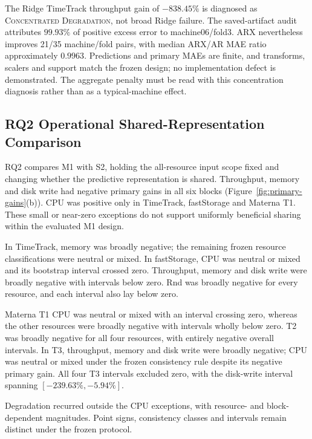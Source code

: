 \documentclass[a4paper,fleqn]{cas-dc}
\begin{document}
The Ridge TimeTrack throughput gain of $-838.45\%$ is diagnosed as
\textsc{Concentrated Degradation}, not broad Ridge failure. The saved-artifact
audit attributes $99.93\%$ of positive excess error to machine06/fold3.
ARX nevertheless improves 21/35 machine/fold pairs, with median ARX/AR MAE
ratio approximately $0.9963$. Predictions and primary MAEs are finite, and
transforms, scalers and support match the frozen design; no implementation
defect is demonstrated. The aggregate penalty must be read with this
concentration diagnosis rather than as a typical-machine effect.

\subsection{RQ2 Operational Shared-Representation Comparison}
\label{sec:results-rq2}

RQ2 compares M1 with S2, holding the all-resource input scope fixed and changing
whether the predictive representation is shared. Throughput, memory and disk
write had negative primary gains in all six blocks
(Figure~\ref{fig:primary-gains}(b)). CPU was positive only in TimeTrack,
fastStorage and Materna T1. These small or near-zero exceptions do not support
uniformly beneficial sharing within the evaluated M1 design.

In TimeTrack, memory was broadly negative; the remaining frozen resource
classifications were neutral or mixed. In fastStorage, CPU was neutral or
mixed and its bootstrap interval crossed zero. Throughput, memory and disk
write were broadly negative with intervals below zero. Rnd was broadly
negative for every resource, and each interval also lay below zero.

Materna T1 CPU was neutral or mixed with an interval crossing zero, whereas
the other resources were broadly negative with intervals wholly below zero.
T2 was broadly negative for all four resources, with entirely negative
overall intervals. In T3, throughput, memory and disk write were broadly
negative; CPU was neutral or mixed under the frozen consistency rule despite
its negative primary gain. All four T3 intervals excluded zero, with the
disk-write interval spanning $[-239.63\%,-5.94\%]$.

Degradation recurred outside the CPU exceptions, with resource- and
block-dependent magnitudes. Point signs, consistency classes and intervals
remain distinct under the frozen protocol.
\end{document}
